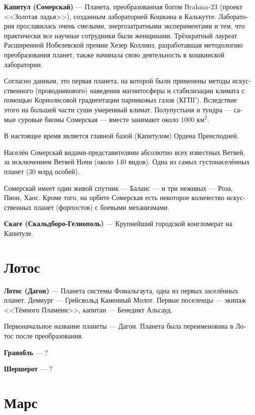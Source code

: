 \documentclass[a4paper,12pt,fleqn]{book}\usepackage{polyglossia}\setdefaultlanguage[babelshorthands=true]{russian}\setotherlanguage{english}\defaultfontfeatures{Ligatures=TeX,Mapping=tex-text}\usepackage{xcolor}\newcommand{\ml}[3]{#2}
\newcommand{\asterism}{\vspace{1em}{\centering\Large\bfseries$\ast~\ast~\ast$\par}\vspace{1em}}
\newcommand{\theterm}[3]{\textbf{\hypertarget{#1}{#2}} --- #3}
\begin{document}
\theterm{capitul}
{Капитул (Сомерскай)}
{Планета, преобразованная богом Brahma-23 (проект <<Золотая ладья>>), созданным лабораторией Кошкина в Калькутте.
Лаборатория прославилась очень смелыми, энергозатратными экспериментами и тем, что практически все научные сотрудники были женщинами.
Трёхкратный лауреат Расширенной Нобелевской премии Хезер Коллинз, разработавшая методологию преобразования планет, также начинала свою деятельность в кошкинской лаборатории.

Согласно данным, это первая планета, на которой были применены методы искусственного (проводникового) наведения магнитосферы и стабилизации климата с помощью Кориолисовой градиентации парниковых газов (КГПГ).
Вследствие этого на большей части суши умеренный климат.
Полупустыня и тундра --- самые суровые биомы Сомерская --- вместе занимают около 1000 км$^2$.

В настоящее время является главной базой (Капитулом) Ордена Преисподней.

Населён Сомерскай видами-представителями абсолютно всех известных Ветвей, за исключением Ветвей Ночи (около 140 видов).
Одна из самых густонаселённых планет (30 млрд особей).

Сомерскай имеет один живой спутник --- Баланс --- и три неживых --- Роза, Пион, Хаос.
Кроме того, на орбите Сомерская есть некоторое количество искусственных планет (форпостов) с боевыми механизмами.}

\asterism

\theterm{scage}
{Скаге (Скальдборо-Гелиополь)}
{Крупнейший городской конгломерат на Капитуле.}

\section{Лотос}

\theterm{lotus}
{Лотос (Дагон)}
{Планета системы Фомальгаута, одна из первых заселённых планет.
Демиург --- Грейсвольд Каменный Молот.
Первые поселенцы --- экипаж <<Тёмного Пламени>>, капитан --- Бенедикт Альсауд.

Первоначальное название планеты --- Дагон.
Планета была переименована в Лотос после преобразования.}

\asterism

\theterm{granoble}
{Гранобль}
{?}

\theterm{chercherotte}
{Шершерот}
{?}

\section{Марс}
\end{document}
